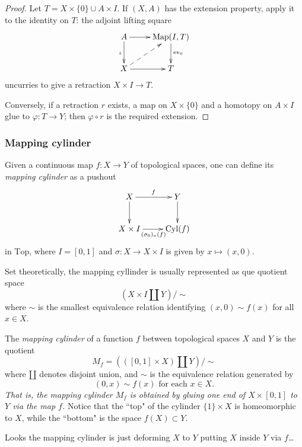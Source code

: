 \begin{proof}
Let $T=X\times\{0\}\cup A\times I$.
If $(X,A)$ has the extension property,
apply it to the identity on $T$: the
adjoint lifting square
$$
\xymatrix{
A\ar[r]\ar[d]_{\iota}
&\operatorname{Map}(I,T)
 \ar[d]^{\operatorname{ev}_0}\\
X\ar[r]
 \ar@{-->}[ur]
&T
}
$$
uncurries to give a retraction $X\times
I\to T$.

Conversely, if a retraction $r$ exists,
a map on $X\times\{0\}$ and a homotopy
on $A\times I$ glue to $\varphi:T\to Y$;
then $\varphi\circ r$ is the required
extension.
\end{proof}

\subsubsection{Mapping cylinder}
\label{subsection-mapping-cylinder}

\begin{definition}
\label{definition-https-ncatl-org-nlab-2}
Given a continuous map $f:X\to Y$ of
topological spaces, one can define its {\it
mapping cylinder} as a pushout
$$
\xymatrix{
		X\ar[r]^{f}\ar[d]&Y\ar[d]\\
		X\times
		I\ar[r]_{(\sigma_0)_*(f)}&\text{Cyl}(f)
	}
$$
	in $\text{Top}$, where $I=[0,1]$ and
	$\sigma:X\to X\times I$ is given by
	$x\mapsto(x,0)$.

	Set theoretically, the mapping cyllinder is
	usually represented as que quotient space
	$$\left(X\times I\coprod Y\right)\Big/\sim$$
	where $\sim$ is the smallest equivalence
	relation identifying $(x,0)\sim f(x)$ for
	all $x\in X$.
\end{definition}

\begin{definition}
\label{definition-https-en-wikip-org-wik-2}
The {\it mapping cylinder} of a function $f$
between topological spaces $X$ and $Y$ is the
quotient
$$M_f=(([0,1]\times X)\amalg Y)\big/\sim$$
where $\amalg$ denotes disjoint union, and
$\sim$ is the equivalence relation generated
by
$$(0,x)\sim f(x)\text{ for each }x\in X.$$
{\it That is, the mapping cylinder $M_f$ is
obtained by gluing one end of $X\times[0,1]$
to $Y$ via the map $f$.} Notice that the
``top" of the cylinder $\{1\}\times X$ is
homeomorphic to $X$, while the ``bottom" is
the space $f(X)\subset Y$.

Looks the mapping cylinder is just deforming
$X$ to $Y$ putting $X$ inside $Y$ via $f$…
\end{definition}

